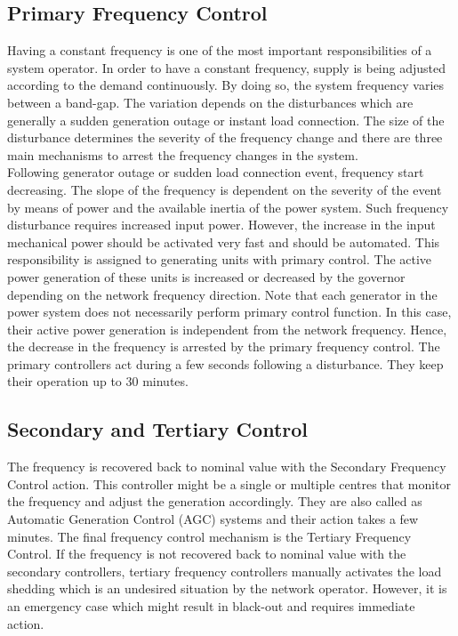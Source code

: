 \subsection{Primary Frequency Control}
Having a constant frequency is one of the most important responsibilities of a system operator. In order to have a constant frequency, supply is being adjusted according to the demand continuously. By doing so, the system frequency varies between a band-gap. The variation depends on the disturbances which are generally a sudden generation outage or instant load connection. The size of the disturbance determines the severity of the frequency change and there are three main mechanisms to arrest the frequency changes in the system. \\
Following generator outage or sudden load connection event, frequency start decreasing. The slope of the frequency is dependent on the severity of the event by means of power and the available inertia of the power system. Such frequency disturbance requires increased input power. However, the increase in the input mechanical power should be activated very fast and should be automated. This responsibility is assigned to generating units with primary control. The active power generation of these units is increased or decreased by the governor depending on the network frequency direction. Note that each generator in the power system does not necessarily perform primary control function. In this case, their active power generation is independent from the network frequency. Hence, the decrease in the frequency is arrested by the primary frequency control. The primary controllers act during a few seconds following a disturbance. They keep their operation up to 30 minutes. 
\subsection{Secondary and Tertiary Control}
The frequency is recovered back to nominal value with the Secondary Frequency Control action. This controller might be a single or multiple centres that monitor the frequency and adjust the generation accordingly. They are also called as Automatic Generation Control (AGC) systems and their action takes a few minutes. The final frequency control mechanism is the Tertiary Frequency Control. If the frequency is not recovered back to nominal value with the secondary controllers, tertiary frequency controllers manually activates the load shedding which is an undesired situation by the network operator. However, it is an emergency case which might result in black-out and requires immediate action.
